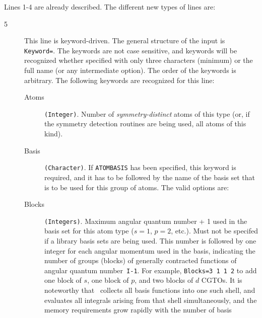 Lines 1-4 are already described. The different new types of lines are:
\begin{description}
\item[5] This line is keyword-driven. The general structure of the input is
\verb|Keyword=|. The keywords are not case sensitive, and keywords will
be recognized whether specified with only three characters (minimum) or
the full name (or any intermediate option).
The order of the keywords is arbitrary.
The following keywords are recognized for this line:
\begin{description}
\item[Atoms] \verb|(Integer)|. Number of {\em
  symmetry-distinct} atoms of 
this type (or, if the symmetry detection routines are being used, all
atoms of this kind).
\item[Basis] \verb|(Character)|. If \verb|ATOMBASIS| has been specified,
  this keyword is required, and it has to be followed by the name of the
  basis set that is to be used for this group of atoms.
  The valid options are:
\item[Blocks] \verb|(Integers)|. Maximum angular quantum number + 1 used in the
basis set for this atom type ($s=1$, $p=2$, etc.).
Must not be specifed if a library basis sets are being used.
This number is followed by one
integer for each angular momentum used in the basis, indicating 
the number of groups (blocks) of generally contracted
functions of angular quantum number~{\tt I-1}.
For example, \verb|Blocks=3 1 1 2| to add one block of $s$,
one block of $p$, and two blocks of $d$ CGTOs.
\newline
It is noteworthy that
\dalton\ collects all basis functions into one such shell, and
evaluates all integrals arising from that 
shell simultaneously, and
the memory requirements grow rapidly with the number of basis

\end{description}
\end{description}

